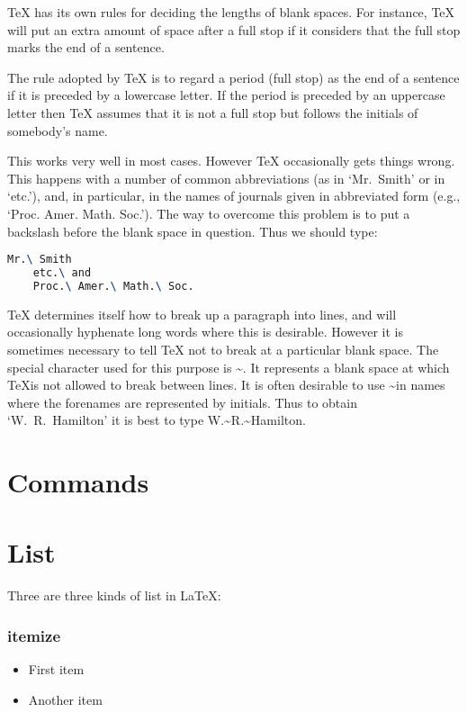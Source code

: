 \TeX{} has its own rules for deciding the lengths of blank spaces. For instance,
\TeX{} will put an extra amount of space after a full stop if it considers
that the full stop marks the end of a sentence.

The rule adopted by \TeX{} is to regard a period (full stop) as the end of a
sentence if it is preceded by a lowercase letter. If the period is preceded by
an uppercase letter then \TeX{} assumes that it is not a full stop but follows
the initials of somebody's name.

This works very well in most cases. However \TeX{} occasionally gets things
wrong. This happens with a number of common abbreviations (as in `Mr.~Smith' 
or in `etc.'), and, in particular, in the names of journals given in
abbreviated form (e.g., `Proc. Amer. Math. Soc.'). The way to overcome this
problem is to put a backslash before the blank space in question. Thus we
should type:
\begin{lstlisting}[language=TeX]
    Mr.\ Smith
    etc.\ and
    Proc.\ Amer.\ Math.\ Soc.
\end{lstlisting}

\TeX{} determines itself how to break up a paragraph into lines, and will
occasionally hyphenate long words where this is desirable. However it is
sometimes necessary to tell \TeX{} not to break at a particular blank space.
The special character used for this purpose is \textasciitilde. It represents 
a blank space at which \TeX is not allowed to break between lines. It is often 
desirable to use \textasciitilde in names where the forenames are represented 
by initials. Thus to obtain `W.~R.~Hamilton' it is best to type 
W.\textasciitilde R.\textasciitilde Hamilton.

\section{Commands}

\section{List}
Three are three kinds of list in \LaTeX{}: 

\subsubsection{itemize}
\begin{itemize}
    \item First item
    \item Another item
\end{itemize}

